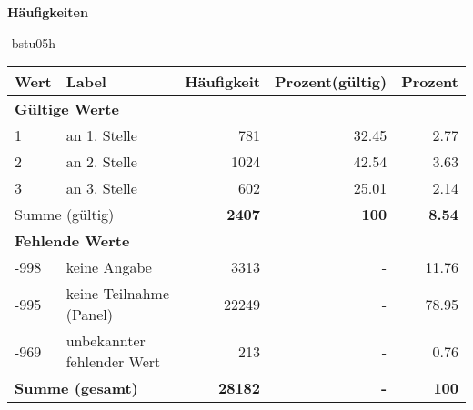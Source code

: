         		\vspace*{0.5cm}
                \noindent\textbf{Häufigkeiten}

                \vspace*{-\baselineskip}
					\begin{filecontents}{\jobname-bstu05h}
					\begin{longtable}{lXrrr}
					\toprule
					\textbf{Wert} & \textbf{Label} & \textbf{Häufigkeit} & \textbf{Prozent(gültig)} & \textbf{Prozent} \\
					\endhead
					\midrule
					\multicolumn{5}{l}{\textbf{Gültige Werte}}\\

					1 &
					\multicolumn{1}{X}{ an 1. Stelle   } &


					  \num{781} &
					  \num[round-mode=places,round-precision=2]{32,45} &
					    \num[round-mode=places,round-precision=2]{2,77} \\

					2 &
					\multicolumn{1}{X}{ an 2. Stelle   } &


					  \num{1024} &
					  \num[round-mode=places,round-precision=2]{42,54} &
					    \num[round-mode=places,round-precision=2]{3,63} \\

					3 &
					\multicolumn{1}{X}{ an 3. Stelle   } &


					  \num{602} &
					  \num[round-mode=places,round-precision=2]{25,01} &
					    \num[round-mode=places,round-precision=2]{2,14} \\
					\midrule
					\multicolumn{2}{l}{Summe (gültig)} &
					  \textbf{\num{2407}} &
					\textbf{100} &
					  \textbf{\num[round-mode=places,round-precision=2]{8,54}} \\
					\multicolumn{5}{l}{\textbf{Fehlende Werte}}\\
							-998 &
							keine Angabe &
							  \num{3313} &
							 - &
							  \num[round-mode=places,round-precision=2]{11,76} \\
							-995 &
							keine Teilnahme (Panel) &
							  \num{22249} &
							 - &
							  \num[round-mode=places,round-precision=2]{78,95} \\
							-969 &
							unbekannter fehlender Wert &
							  \num{213} &
							 - &
							  \num[round-mode=places,round-precision=2]{0,76} \\
					\midrule
					\multicolumn{2}{l}{\textbf{Summe (gesamt)}} &
				      \textbf{\num{28182}} &
				    \textbf{-} &
				    \textbf{100} \\
					\bottomrule
					\end{longtable}
					\end{filecontents}
